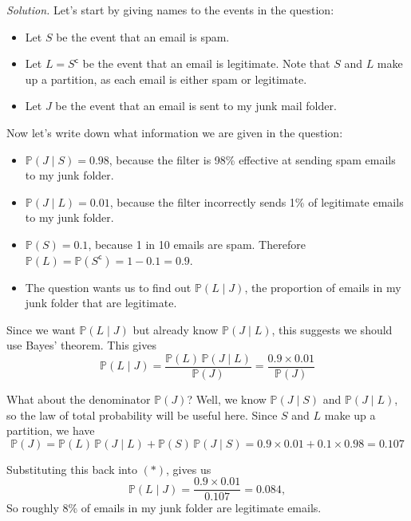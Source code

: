 \documentclass[
  a4paper,
]{book}
\providecommand{\tightlist}{%
  \setlength{\itemsep}{0pt}\setlength{\parskip}{0pt}}
\theoremstyle{definition}
\theoremstyle{definition}
\theoremstyle{definition}
\theoremstyle{definition}
\theoremstyle{remark}
\begin{document}
\begin{myanswers}

\emph{Solution.} Let's start by giving names to the events in the question:

\begin{itemize}
\tightlist
\item
  Let \(S\) be the event that an email is spam.
\item
  Let \(L = S^{\mathsf{c}}\) be the event that an email is legitimate. Note that \(S\) and \(L\) make up a partition, as each email is either spam or legitimate.
\item
  Let \(J\) be the event that an email is sent to my junk mail folder.
\end{itemize}

Now let's write down what information we are given in the question:

\begin{itemize}
\tightlist
\item
  \(\mathbb P(J \mid S) = 0.98\), because the filter is 98\% effective at sending spam emails to my junk folder.
\item
  \(\mathbb P(J \mid L) = 0.01\), because the filter incorrectly sends 1\% of legitimate emails to my junk folder.
\item
  \(\mathbb P(S) = 0.1\), because 1 in 10 emails are spam. Therefore \(\mathbb P(L) = \mathbb P(S^{\mathsf{c}}) = 1 - 0.1 = 0.9\).
\item
  The question wants us to find out \(\mathbb P(L \mid J)\), the proportion of emails in my junk folder that are legitimate.
\end{itemize}

Since we want \(\mathbb P(L \mid J)\) but already know \(\mathbb P(J \mid L)\), this suggests we should use Bayes' theorem. This gives
\[ \mathbb P(L \mid J) = \frac{\mathbb P(L) \, \mathbb P(J \mid L)}{\mathbb P(J)} = \frac{0.9 \times 0.01}{\mathbb P(J)} \tag{$*$} \]

What about the denominator \(\mathbb P(J)\)? Well, we know \(\mathbb P(J \mid S)\) and \(\mathbb P(J \mid L)\), so the law of total probability will be useful here. Since \(S\) and \(L\) make up a partition, we have
\[ \mathbb P(J) = \mathbb P(L) \, \mathbb P(J \mid L) + \mathbb P(S) \, \mathbb P(J \mid S) = 0.9 \times 0.01 + 0.1 \times 0.98 = 0.107 \]

Substituting this back into \((*)\), gives us
\[ \mathbb P(L \mid J) = \frac{0.9 \times 0.01}{0.107} = 0.084 , \]
So roughly 8\% of emails in my junk folder are legitimate emails.


\end{myanswers}
\end{document}
